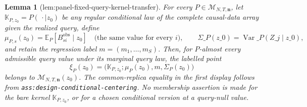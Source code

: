 \documentclass{article}
\newtheorem{lemma}{Lemma}
\begin{document}
\begin{lemma}[lem:panel-fixed-query-kernel-transfer]\label{lem:panel-fixed-query-kernel-transfer}
For every \(P\in\mathcal M_{N,T,\mathbf n}\), let
\(\mathbb K_{P,z_0}=P(\,\cdot\mid z_0)\) be any regular conditional law of
the complete causal-data array given the realized query, define
\[
 \mu_{P,s}(z_0)=\mathbb E_P[B_{si}^{\mathrm{obs}}\mid z_0]
 \quad\text{(the same value for every \(i\))},
 \qquad
 \Sigma\_P(z\_0)=\operatorname{Var}\_P(Z\_j\mid z\_0),
\]
and retain the regression label \(m=(m_1,\ldots,m_S)\).  Then, for
\(P\)-almost every admissible query value under its marginal query law, the
labelled point
\[
 \xi_P(z_0)=\bigl(\mathbb K_{P,z_0};\mu_P(z_0),m,
                         \Sigma_P(z_0)\bigr)
\]
belongs to \(\mathcal M_{N,T,\mathbf n}(z_0)\).  The common-replica equality
in the first display follows from \texttt{ass:design-conditional-centering}.
No membership assertion is made for the bare kernel \(\mathbb K_{P,z_0}\),
or for a chosen conditional version at a query-null value.
\end{lemma}
\end{document}
